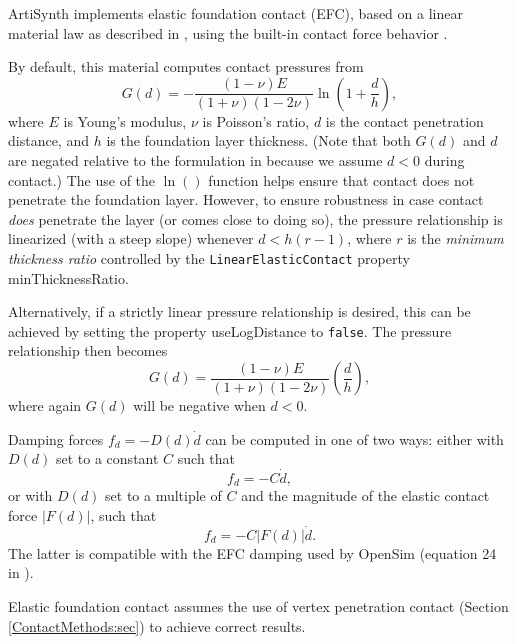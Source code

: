 ArtiSynth implements elastic foundation contact (EFC), based on a linear
material law as described in \cite{bei2004multibody}, using
the built-in contact force behavior 
.

By default, this material computes contact pressures from
%
\begin{equation}
G(d) = -\frac{(1-\nu) E}{(1+\nu)(1-2 \nu)} \ln \left( 1 + \frac{d}{h} \right),
\label{logEFC:eqn}
\end{equation}
%
where $E$ is Young's modulus, $\nu$ is Poisson's ratio, $d$ is the
contact penetration distance, and $h$ is the foundation layer
thickness. (Note that both $G(d)$ and $d$ are negated relative to the
formulation in \cite{bei2004multibody} because we assume $d <0$ during
contact.) The use of the $\ln()$ function helps ensure that contact
does not penetrate the foundation layer. However, to ensure robustness
in case contact {\it does} penetrate the layer (or comes close to
doing so), the pressure relationship is linearized (with a steep
slope) whenever $d < h (r-1)$, where $r$ is the {\it minimum thickness
ratio} controlled by the {\tt LinearElasticContact} property {\sf
minThicknessRatio}.

Alternatively, if a strictly linear pressure relationship is desired,
this can be achieved by setting the property {\sf useLogDistance} 
to {\tt false}. The pressure relationship then becomes
%
\begin{equation}
G(d) = \frac{(1-\nu) E}{(1+\nu)(1-2 \nu)}\left(\frac{d}{h}\right),
\label{linearEFC:eqn}
\end{equation}
%
where again $G(d)$ will be negative when $d < 0$.

Damping forces $f_d = -D(d) \dot d$ can be computed in one of two ways: either
with $D(d)$ set to a constant $C$ such that
%
\begin{equation}
f_d = - C \dot d,
\label{directDamping:eqn}
\end{equation}
%
or with $D(d)$ set to a multiple of $C$ and the magnitude of the
elastic contact force $|F(d)|$, such that
%
\begin{equation}
f_d = - C |F(d)| \dot d.
\label{forceDamping:eqn}
\end{equation}
%
The latter is compatible with the EFC damping used by
OpenSim (equation 24 in \cite{sherman2011simbody}).

\begin{sideblock}
Elastic foundation contact assumes the use of vertex penetration
contact (Section \ref{ContactMethods:sec}) to achieve correct
results.
\end{sideblock}

